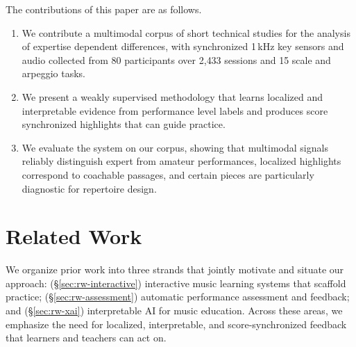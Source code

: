 \documentclass[sigconf,review,anonymous]{acmart}
\begin{document}
The contributions of this paper are as follows.
\begin{enumerate}
\item We contribute a multimodal corpus of short technical studies for the analysis of expertise dependent differences, with synchronized 1\,kHz key sensors and audio collected from 80 participants over 2{,}433 sessions and 15 scale and arpeggio tasks.
\item We present a weakly supervised methodology that learns localized and interpretable evidence from performance level labels and produces score synchronized highlights that can guide practice.
\item We evaluate the system on our corpus, showing that multimodal signals reliably distinguish expert from amateur performances, localized highlights correspond to coachable passages, and certain pieces are particularly diagnostic for repertoire design.
\end{enumerate}







\section{Related Work}

We organize prior work into three strands that jointly motivate and situate our approach: (\S\ref{sec:rw-interactive}) interactive music learning systems that scaffold practice; (\S\ref{sec:rw-assessment}) automatic performance assessment and feedback; and (\S\ref{sec:rw-xai}) interpretable AI for music education. Across these areas, we emphasize the need for localized, interpretable, and score-synchronized feedback that learners and teachers can act on.

\end{document}
